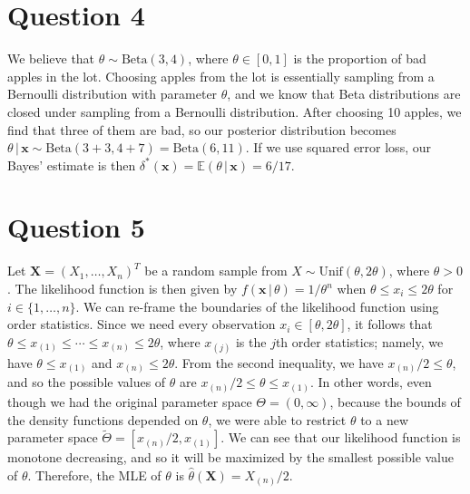 \documentclass[10pt]{article}
\begin{document}
\section{Question 4} \noindent
We believe that \(\theta \sim \mathrm{Beta}(3, 4)\), where \(\theta \in [0,1]\) is the proportion of bad apples in the lot. 
Choosing apples from the lot is essentially sampling from a Bernoulli distribution with parameter \(\theta\),
and we know that Beta distributions are closed under sampling from a Bernoulli distribution. After choosing 
10 apples, we find that three of them are bad, so our posterior distribution becomes \(\theta \,|\, \mathbf{x} \sim \mathrm{Beta}(3+3, 4+7) = \mathrm{Beta}(6,11)\).
If we use squared error loss, our Bayes' estimate is then \(\delta^*(\mathbf{x}) = \mathbb{E}(\theta \,|\, \mathbf{x}) = 6 / 17\).

\section{Question 5} \noindent
Let \(\bm{X} = (X_1, \ldots, X_n)^T\) be a random sample from \(X \sim \mathrm{Unif}(\theta, 2\theta)\), where \(\theta > 0\). The likelihood function is then given by 
\(f(\mathbf{x} \,|\, \theta) = 1 / \theta^n\) when \(\theta \le x_i \le 2\theta\) for \(i \in \{1,\ldots,n\}\). We can re-frame the boundaries of the likelihood 
function using order statistics. Since we need every observation \(x_i \in [\theta, 2\theta]\), it follows that 
\(\theta \le x_{(1)} \le \cdots \le x_{(n)} \le 2\theta\), where \(x_{(j)}\) is the \(j\)th order statistics; namely, we have \(\theta \le x_{(1)}\) 
and \(x_{(n)} \le 2 \theta\). From the second inequality,
we have \(x_{(n)}/2 \le \theta\), and so the possible values of \(\theta\) are \(x_{(n)}/2 \le \theta \le x_{(1)}\). In other words, 
even though we had the original parameter space \(\Theta = (0, \infty)\), because the bounds of the density functions depended on \(\theta\), we were able to 
restrict \(\theta\) to a new parameter space \(\tilde{\Theta} = [x_{(n)}/2, x_{(1)}]\). We can see that our likelihood function is monotone decreasing, and so 
it will be maximized by the smallest possible value of \(\theta\). Therefore, the MLE of \(\theta\) is \(\hat{\theta}(\bm{X}) = X_{(n)} / 2\).
\end{document}
